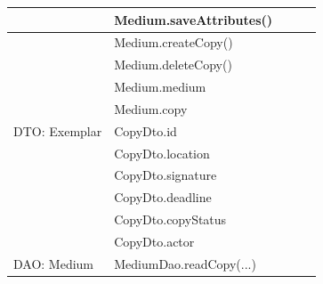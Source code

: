 \documentclass{article}
\begin{document}
\begin{longtable}{|l|l|l|l|l|}
\hline
                                        & Medium.saveAttributes()                  &                           &                             &                        \\ 
\hline
                                        & Medium.createCopy()                      &                           &                             &                        \\ 
\hline
                                        & Medium.deleteCopy()                      &                           &                             &                        \\ 
\hline
                                        & Medium.medium                            &                           &                             &                        \\ 
\hline
                                        & Medium.copy                              &                           &                             &                        \\ 
\hline
DTO: Exemplar                           & CopyDto.id                               &                           &                             &                        \\ 
\hline
                                        & CopyDto.location                         &                           &                             &                        \\ 
\hline
                                        & CopyDto.signature                        &                           &                             &                        \\ 
\hline
                                        & CopyDto.deadline                         &                           &                             &                        \\ 
\hline
                                        & CopyDto.copyStatus                       &                           &                             &                        \\ 
\hline
                                        & CopyDto.actor                            &                           &                             &                        \\ 
\hline
DAO: Medium                             & MediumDao.readCopy(...)                  &                           &                             &                        \\ 

\end{longtable}
\end{document}
